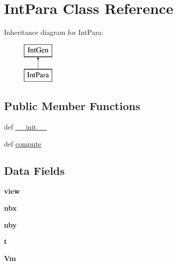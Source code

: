 \hypertarget{classcell__mdl_1_1_int_para}{
\section{IntPara Class Reference}
\label{classcell__mdl_1_1_int_para}
}
Inheritance diagram for IntPara:\begin{figure}[H]
\begin{center}
\leavevmode
\includegraphics[height=2cm]{classcell__mdl_1_1_int_para}
\end{center}
\end{figure}
\subsection*{Public Member Functions}
\begin{DoxyCompactItemize}
\item 
def \hyperlink{classcell__mdl_1_1_int_para_ac775ee34451fdfa742b318538164070e}{\_\-\_\-init\_\-\_\-}
\item 
def \hyperlink{classcell__mdl_1_1_int_para_aaa2084b96999fb1734fd2f330bfa01a6}{compute}
\end{DoxyCompactItemize}
\subsection*{Data Fields}
\begin{DoxyCompactItemize}
\item 
\hypertarget{classcell__mdl_1_1_int_para_a6838f02691e22b3e6bc338e61f647d52}{
{\bfseries view}}
\label{classcell__mdl_1_1_int_para_a6838f02691e22b3e6bc338e61f647d52}

\item 
\hypertarget{classcell__mdl_1_1_int_para_a5d50b03d9e70ea73ca7ef3abe59b5d50}{
{\bfseries nbx}}
\label{classcell__mdl_1_1_int_para_a5d50b03d9e70ea73ca7ef3abe59b5d50}

\item 
\hypertarget{classcell__mdl_1_1_int_para_a673c0649f4acd57528b5ddf3e3b4fd6b}{
{\bfseries nby}}
\label{classcell__mdl_1_1_int_para_a673c0649f4acd57528b5ddf3e3b4fd6b}

\item 
\hypertarget{classcell__mdl_1_1_int_para_aaccc9105df5383111407fd5b41255e23}{
{\bfseries t}}
\label{classcell__mdl_1_1_int_para_aaccc9105df5383111407fd5b41255e23}

\item 
\hypertarget{classcell__mdl_1_1_int_para_ae2db27d1cd25ddde897eb53858084365}{
{\bfseries Vm}}
\label{classcell__mdl_1_1_int_para_ae2db27d1cd25ddde897eb53858084365}

\end{DoxyCompactItemize}



